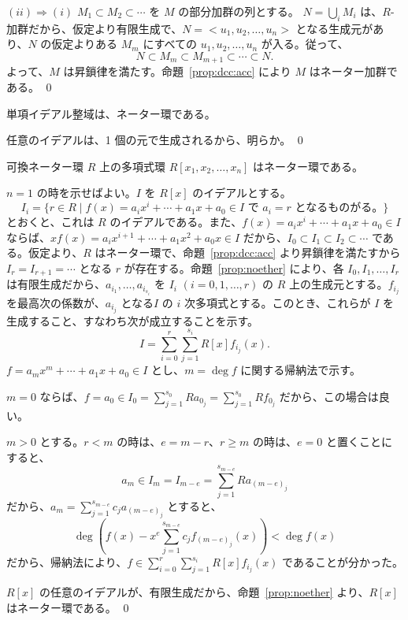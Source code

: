 $(ii)\Rightarrow (i)$ $M_1\subset M_2 \subset \cdots $ を $M$ の部分加群の列とする。
$N = \bigcup_iM_i$ は、$R$-加群だから、仮定より有限生成で、$N = <u_1,u_2,\ldots, u_n>$ となる生成元があり、$N$ の仮定よりある $M_m$ にすべての $u_1, u_2, \ldots, u_n$ が入る。従って、
$$N \subset M_m\subset M_{m+1}\subset \cdots \subset N.$$
よって、$M$ は昇鎖律を満たす。命題~\ref{prop:dcc:acc} により $M$ はネーター加群である。
\qed

\begin{cor}
単項イデアル整域は、ネーター環である。
\end{cor}
\proof
任意のイデアルは、1 個の元で生成されるから、明らか。
\qed

\begin{thm} \label{thm:polyovernoether}
可換ネーター環 $R$ 上の多項式環 $R[x_1,x_2,\ldots, x_n]$ はネーター環である。
\end{thm}
\proof
$n=1$ の時を示せばよい。$I$ を $R[x]$ のイデアルとする。
$$I_i = \{r\in R\mid f(x) = a_ix^i + \cdots + a_1x + a_0 \in I \mbox{ で } a_i = r\mbox{ となるものがる。}\}$$
とおくと、これは $R$ のイデアルである。また、$f(x) = a_ix^i + \cdots + a_1x + a_0\in I$ ならば、$xf(x) = a_ix^{i+1} + \cdots + a_1x^2 + a_0x\in I$ だから、$I_0\subset I_1\subset I_2 \subset \cdots $ である。仮定より、$R$ はネーター環で、命題~\ref{prop:dcc:acc} より昇鎖律を満たすから$I_r = I_{r+1} = \cdots $ となる $r$ が存在する。命題~\ref{prop:noether} により、各 $I_0, I_1, \ldots, I_r$ は有限生成だから、$a_{i_1},\ldots, a_{i_{s_i}}$ を $I_i$ $(i = 0, 1, \ldots, r)$ の $R$ 上の生成元とする。$f_{i_j}$ を最高次の係数が、$a_{i_j}$ となる$I$ の $i$ 次多項式とする。このとき、これらが $I$ を生成すること、すなわち次が成立することを示す。
$$I = \sum_{i=0}^r\sum_{j = 1}^{s_i} R[x]f_{i_j}(x).$$
$f = a_mx^m + \cdots + a_1x + a_0\in I$ とし、$m = \deg f$ に関する帰納法で示す。

$m = 0$ ならば、$f = a_0 \in I_0 = \sum_{j=1}^{s_0}Ra_{0_j} = \sum_{j=1}^{s_0}Rf_{0_j}$ だから、この場合は良い。

$m>0$ とする。$r<m$ の時は、$e = m-r$、$r\geq m$ の時は、$e = 0$ と置くことにすると、
$$a_m \in I_m = I_{m-e} = \sum_{j = 1}^{s_{m-e}}Ra_{(m-e)_j}$$
だから、$a_m = \sum_{j = 1}^{s_{m-e}}c_ja_{(m-e)_j}$ とすると、
$$\deg (f(x) - x^{e}\sum_{j = 1}^{s_{m-e}}c_jf_{(m-e)_j}(x)) < \deg f(x)$$
だから、帰納法により、$f\in \sum_{i=0}^r\sum_{j = 1}^{s_i} R[x]f_{i_j}(x)$ であることが分かった。

$R[x]$ の任意のイデアルが、有限生成だから、命題~\ref{prop:noether} より、$R[x]$ はネーター環である。
\qed

